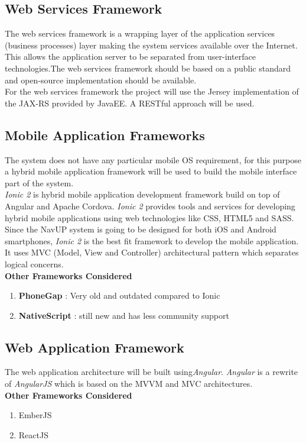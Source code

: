 \subsection{Web Services Framework}
The web services framework is a wrapping layer of the application services (business processes) layer making the system services available over the Internet. This allows the application server to be separated from user-interface technologies.The web services framework should be based on a public standard and open-source implementation should be available.\\[0.2cm]
For the web services framework the project will use the Jersey implementation of the JAX-RS provided by JavaEE. A RESTful approach will be used.
\subsection{Mobile Application Frameworks}	
The system does not have any particular mobile OS requirement, for this purpose a hybrid mobile application framework will be used to build the mobile interface part of the system.\\[0.2cm]
 \textit{Ionic 2} is hybrid mobile application development framework build on top of Angular and Apache Cordova. \textit{Ionic 2} provides tools and services for developing hybrid mobile applications using web technologies like CSS, HTML5 and SASS. Since the NavUP system is going to be designed for both iOS and Android smartphones, \textit{Ionic 2} is the best fit framework to develop the mobile application. \\[0.2cm]
	It uses MVC (Model, View and Controller) architectural pattern which separates logical concerns.\\[0.2cm]
	\textbf{Other Frameworks Considered}\\ 
	\begin{enumerate}
		\item \textbf{PhoneGap} : Very old and outdated compared to Ionic
		\item \textbf{NativeScript} : still new and has less community support
	\end{enumerate}

\subsection{Web Application Framework}
 The web application architecture will be built using\textit{Angular}. \textit{Angular} is a rewrite of \textit{AngularJS} which is based on the MVVM and MVC architectures. \\
	
 \textbf{Other Frameworks Considered}\\ 
	\begin{enumerate}
		\item EmberJS 
		\item ReactJS
	\end{enumerate}

	